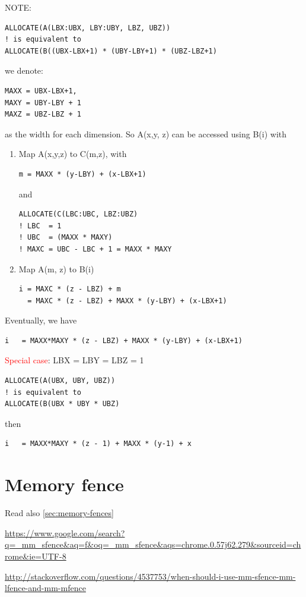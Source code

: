 NOTE:
\begin{lstlisting}
ALLOCATE(A(LBX:UBX, LBY:UBY, LBZ, UBZ))
! is equivalent to
ALLOCATE(B((UBX-LBX+1) * (UBY-LBY+1) * (UBZ-LBZ+1)
\end{lstlisting}
we denote: 
\begin{verbatim}
MAXX = UBX-LBX+1, 
MAXY = UBY-LBY + 1
MAXZ = UBZ-LBZ + 1
\end{verbatim}
as the width for each dimension.  So A(x,y, z) can be accessed using B(i)
with
\begin{enumerate}
\item Map A(x,y,z) to C(m,z), with
\begin{lstlisting}
m = MAXX * (y-LBY) + (x-LBX+1)
\end{lstlisting}
  and
\begin{lstlisting}
ALLOCATE(C(LBC:UBC, LBZ:UBZ)
! LBC  = 1
! UBC  = (MAXX * MAXY)
! MAXC = UBC - LBC + 1 = MAXX * MAXY
\end{lstlisting}

\item Map A(m, z) to B(i)
\begin{lstlisting}
i = MAXC * (z - LBZ) + m
  = MAXC * (z - LBZ) + MAXX * (y-LBY) + (x-LBX+1)
\end{lstlisting}

\end{enumerate}
Eventually, we have
\begin{lstlisting}
i   = MAXX*MAXY * (z - LBZ) + MAXX * (y-LBY) + (x-LBX+1)
\end{lstlisting}


\textcolor{red}{Special case}: LBX = LBY = LBZ = 1 
\begin{lstlisting}
ALLOCATE(A(UBX, UBY, UBZ))
! is equivalent to
ALLOCATE(B(UBX * UBY * UBZ)
\end{lstlisting}
then
\begin{lstlisting}
i   = MAXX*MAXY * (z - 1) + MAXX * (y-1) + x
\end{lstlisting}


\section{Memory fence}

Read also \ref{sec:memory-fences}

\url{https://www.google.com/search?q=_mm_sfence&aq=f&oq=_mm_sfence&aqs=chrome.0.57j62.279&sourceid=chrome&ie=UTF-8}

\url{http://stackoverflow.com/questions/4537753/when-should-i-use-mm-sfence-mm-lfence-and-mm-mfence}


